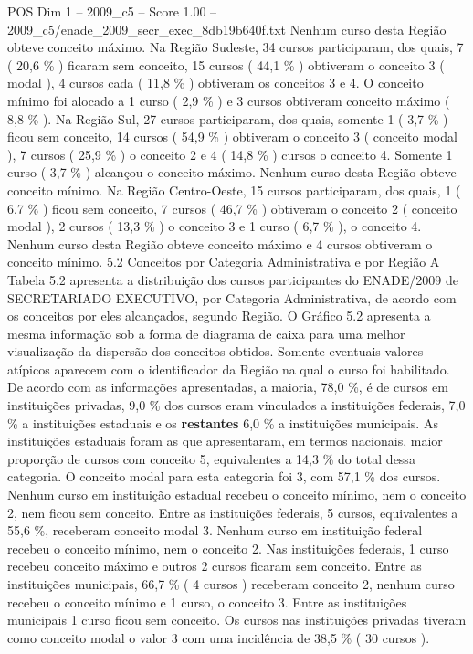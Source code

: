\begin{textsample}{POS Dim 1 – 2009\_c5 – Score 1.00 – 2009\_c5/enade\_2009\_secr\_exec\_8db19b640f.txt}
Nenhum curso desta Região obteve conceito máximo.
Na Região Sudeste, 34 cursos participaram, dos quais, 7 ( 20,6 \% ) ficaram sem conceito, 15 cursos ( 44,1 \% ) obtiveram o conceito 3 ( modal ), 4 cursos cada ( 11,8 \% ) obtiveram os conceitos 3 e 4.
O conceito mínimo foi alocado a 1 curso ( 2,9 \% ) e 3 cursos obtiveram conceito máximo ( 8,8 \% ).
Na Região Sul, 27 cursos participaram, dos quais, somente 1 ( 3,7 \% ) ficou sem conceito, 14 cursos ( 54,9 \% ) obtiveram o conceito 3 ( conceito modal ), 7 cursos ( 25,9 \% ) o conceito 2 e 4 ( 14,8 \% ) cursos o conceito 4.
Somente 1 curso ( 3,7 \% ) alcançou o conceito máximo.
Nenhum curso desta Região obteve conceito mínimo.
Na Região Centro-Oeste, 15 cursos participaram, dos quais, 1 ( 6,7 \% ) ficou sem conceito, 7 cursos ( 46,7 \% ) obtiveram o conceito 2 ( conceito modal ), 2 cursos ( 13,3 \% ) o conceito 3 e 1 curso ( 6,7 \% ), o conceito 4.
Nenhum curso desta Região obteve conceito máximo e 4 cursos obtiveram o conceito mínimo. 5.2 Conceitos por Categoria Administrativa e por Região A Tabela 5.2 apresenta a distribuição dos cursos participantes do ENADE/2009 de SECRETARIADO EXECUTIVO, por Categoria Administrativa, de acordo com os conceitos por eles alcançados, segundo Região.
O Gráfico 5.2 apresenta a mesma informação sob a forma de diagrama de caixa para uma melhor visualização da dispersão dos conceitos obtidos.
Somente eventuais valores atípicos aparecem com o identificador da Região na qual o curso foi habilitado.
De acordo com as informações apresentadas, a maioria, 78,0 \%, é de cursos em instituições privadas, 9,0 \% dos cursos eram vinculados a instituições federais, 7,0 \% a instituições estaduais e os \textbf{restantes} 6,0 \% a instituições municipais.
As instituições estaduais foram as que apresentaram, em termos nacionais, maior proporção de cursos com conceito 5, equivalentes a 14,3 \% do total dessa categoria.
O conceito modal para esta categoria foi 3, com 57,1 \% dos cursos.
Nenhum curso em instituição estadual recebeu o conceito mínimo, nem o conceito 2, nem ficou sem conceito.
Entre as instituições federais, 5 cursos, equivalentes a 55,6 \%, receberam conceito modal 3.
Nenhum curso em instituição federal recebeu o conceito mínimo, nem o conceito 2.
Nas instituições federais, 1 curso recebeu conceito máximo e outros 2 cursos ficaram sem conceito.
Entre as instituições municipais, 66,7 \% ( 4 cursos ) receberam conceito 2, nenhum curso recebeu o conceito mínimo e 1 curso, o conceito 3.
Entre as instituições municipais 1 curso ficou sem conceito.
Os cursos nas instituições privadas tiveram como conceito modal o valor 3 com uma incidência de 38,5 \% ( 30 cursos ).

\end{textsample}
